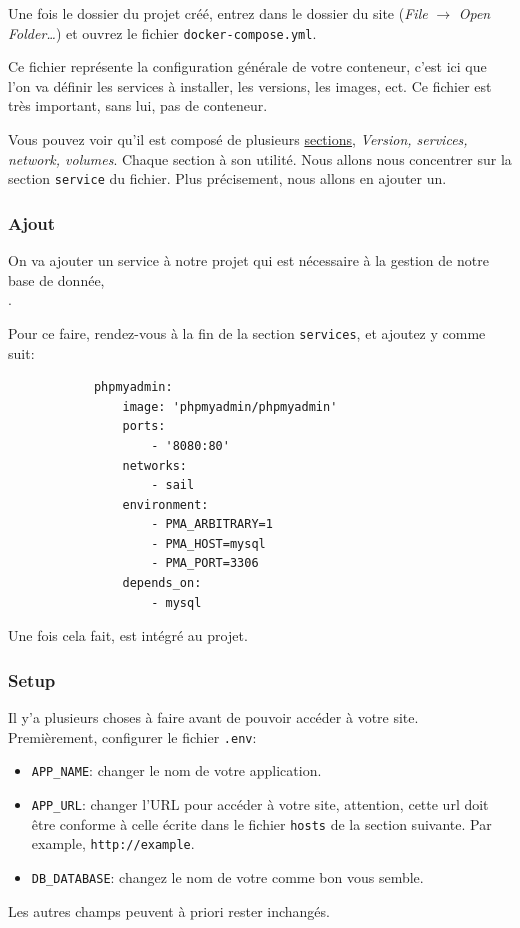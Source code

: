         Une fois le dossier du projet créé, entrez dans le dossier du site (\textit{File} $\rightarrow$ \textit{Open Folder\ldots}) et ouvrez le fichier \verb|docker-compose.yml|.

        Ce fichier représente la configuration générale de votre conteneur, c'est ici que l'on va définir les services à installer, les versions, les images, ect.
        Ce fichier est très important, sans lui, pas de conteneur.

        Vous pouvez voir qu'il est composé de plusieurs \href{https://docs.docker.com/compose/compose-file/}{sections}, \textit{Version, services, network, volumes}. Chaque section à son utilité. Nous allons nous concentrer sur la section \verb|service| du fichier. Plus précisement, nous allons en ajouter un.


    \subsubsection[Ajout PhpMyAdmin]{Ajout \phpmyadmin{}}

        On va ajouter un service à notre projet qui est nécessaire à la gestion de notre base de donnée,\\ \phpmyadmin{}.
        
        Pour ce faire, rendez-vous à la fin de la section \verb|services|, et ajoutez y \phpmyadmin{} comme suit:

        \begin{lstlisting}
            phpmyadmin:
                image: 'phpmyadmin/phpmyadmin'
                ports:
                    - '8080:80'
                networks:
                    - sail
                environment:
                    - PMA_ARBITRARY=1
                    - PMA_HOST=mysql
                    - PMA_PORT=3306
                depends_on:
                    - mysql
        \end{lstlisting}

        Une fois cela fait, \phpmyadmin{} est intégré au projet.

        \subsubsection[Setup]{Setup}
        Il y'a plusieurs choses à faire avant de pouvoir accéder à votre site. Premièrement, configurer le fichier \verb|.env|:

        \begin{itemize}
            \item \verb|APP_NAME|: changer le nom de votre application.
            \item \verb|APP_URL|: changer l'URL pour accéder à votre site, attention, cette url doit être conforme à celle écrite dans le fichier \verb|hosts| de la section suivante. Par example, \verb|http://example|.
            \item \verb|DB_DATABASE|: changez le nom de votre \db{} comme bon vous semble.
        \end{itemize}
        Les autres champs peuvent à priori rester inchangés.

